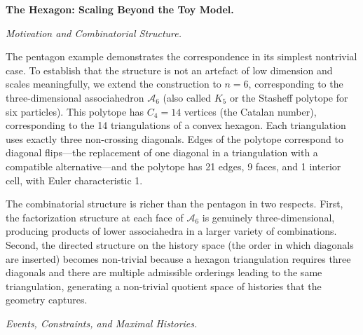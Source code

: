 \documentclass[11pt]{article}
\theoremstyle{plain}
\theoremstyle{definition}
\theoremstyle{remark}
\begin{document}
\bigskip\noindent\textbf{The Hexagon: Scaling Beyond the Toy Model.}
\label{sec:hexagon}

\medskip\noindent\textit{Motivation and Combinatorial Structure.}

The pentagon example demonstrates the correspondence in its simplest nontrivial case. To establish that the structure is not an artefact of low dimension and scales meaningfully, we extend the construction to $n = 6$, corresponding to the three-dimensional associahedron $\mathcal{A}_6$ (also called $K_5$ or the Stasheff polytope for six particles). This polytope has $C_4 = 14$ vertices (the Catalan number), corresponding to the 14 triangulations of a convex hexagon. Each triangulation uses exactly three non-crossing diagonals. Edges of the polytope correspond to diagonal flips---the replacement of one diagonal in a triangulation with a compatible alternative---and the polytope has 21 edges, 9 faces, and 1 interior cell, with Euler characteristic 1.

The combinatorial structure is richer than the pentagon in two respects. First, the factorization structure at each face of $\mathcal{A}_6$ is genuinely three-dimensional, producing products of lower associahedra in a larger variety of combinations. Second, the directed structure on the history space (the order in which diagonals are inserted) becomes non-trivial because a hexagon triangulation requires three diagonals and there are multiple admissible orderings leading to the same triangulation, generating a non-trivial quotient space of histories that the geometry captures.

\medskip\noindent\textit{Events, Constraints, and Maximal Histories.}
\end{document}
